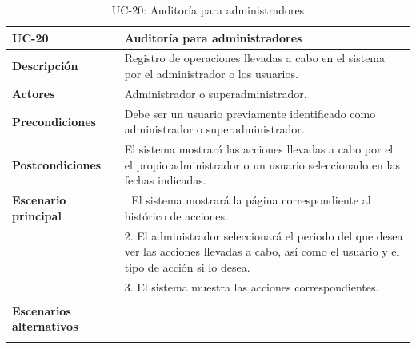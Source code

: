 \begin{table}
  \begin{center}
    \begin{tabularx}{16.4cm}{|l|X|}
      \hline
      \textbf{UC-20} & \textbf{Auditoría para administradores}\\
      \hline
      \textbf{Descripción} & Registro de operaciones llevadas a cabo en el sistema por el administrador o los usuarios.\\
      \hline
      \textbf{Actores} & Administrador o superadministrador.\\
      \hline
      \textbf{Precondiciones} & Debe ser un usuario previamente identificado como administrador o superadministrador.\\
      \hline
      \textbf{Postcondiciones} & El sistema mostrará las acciones llevadas a cabo por el el propio administrador o un usuario seleccionado en las fechas indicadas.\\
      \hline
      \textbf{Escenario principal} & \smallskip 1. El sistema mostrará la página correspondiente al histórico de acciones.\\
      & 2. El administrador seleccionará el periodo del que desea ver las acciones llevadas a cabo, así como el usuario y el tipo de acción si lo desea.\\
      & 3. El sistema muestra las acciones correspondientes.\\
      & \\
      \hline
      \textbf{Escenarios alternativos} & \\
      & \\
      \hline
    \end{tabularx}
    \caption{UC-20: Auditoría para administradores}
    \label{tab:CU-auditorias-admin}
  \end{center}
\end{table}


